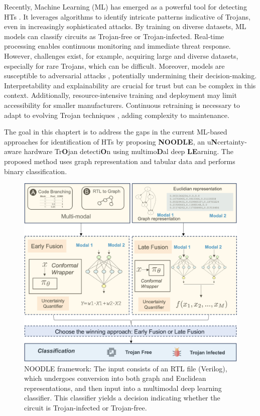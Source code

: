 Recently, Machine Learning (ML) has emerged as a powerful tool for detecting HTs \cite{gubbi2023hardware, huang2020survey, liakos2019machine, koblah2023survey, koylu2023survey}. %
It leverages algorithms to identify intricate patterns indicative of Trojans, even in increasingly sophisticated attacks. By training on diverse datasets, ML models can classify circuits as Trojan-free or Trojan-infected. Real-time processing enables continuous monitoring and immediate threat response. However, challenges exist, for example, acquiring large and diverse datasets, especially for rare Trojans, which can be difficult. Moreover, models are susceptible to adversarial attacks \cite{west2023towards}, potentially undermining their decision-making. Interpretability \cite{li2022interpretable} and explainability \cite{caruana2020intelligible} are crucial for trust but can be complex in this context. Additionally, resource-intensive training and deployment may limit accessibility for smaller manufacturers. Continuous retraining is necessary to adapt to evolving Trojan techniques \cite{Vishwakarma:ICCAD}, adding complexity to maintenance. 

The goal in this chaptert is to address the gaps in the current ML-based approaches for identification of HTs by %
proposing \textbf{NOODLE}, an u\textbf{N}certainty-aware hardware Tr\textbf{O}jan detecti\textbf{O}n using multimo\textbf{D}al deep \textbf{LE}arning. The proposed method uses graph representation and tabular data and performs binary classification.

\begin{figure}[ht]
  \centering
   \includegraphics[width=1\textwidth]{figs/RV2.png}
   \caption{NOODLE framework: The input consists of an RTL file (Verilog), which undergoes conversion into both graph and Euclidean representations, and then input into a multimodal deep learning classifier. This classifier yields a decision indicating whether the circuit is Trojan-infected or Trojan-free.}
  \label{fig:intro}
\end{figure}


